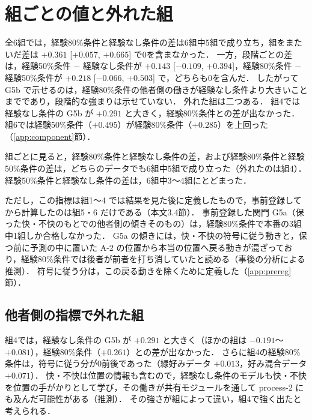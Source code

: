 \section{組ごとの値と外れた組}\label{sup:values}
\begin{table}[tbp]
  \centering
  \small
  \caption{組ごとの値と組をまたいだ差}
  \label{tab:group_values}
  
\end{table}

全6組では，経験80\%条件と経験なし条件の差は6組中5組で成り立ち，組をまたいだ差は $+0.361$ [$+0.057$, $+0.665$] で0を含まなかった．
一方，段階ごとの差は，経験50\%条件 $-$ 経験なし条件が $+0.143$ [$-0.109$, $+0.394$]，経験80\%条件 $-$ 経験50\%条件が $+0.218$ [$-0.066$, $+0.503$] で，どちらも0を含んだ．
したがって G5b で示せるのは，経験80\%条件の他者側の働きが経験なし条件より大きいことまでであり，段階的な強まりは示せていない．
外れた組は二つある．
組4では経験なし条件の G5b が $+0.291$ と大きく，経験80\%条件との差が出なかった．
組6では経験50\%条件（$+0.495$）が経験80\%条件（$+0.285$）を上回った（\ref{app:component}節）．

組ごとに見ると，経験80\%条件と経験なし条件の差，および経験80\%条件と経験50\%条件の差は，どちらのデータでも6組中5組で成り立った（外れたのは組4）．
経験50\%条件と経験なし条件の差は，6組中3〜4組にとどまった．

ただし，この指標は組1〜4 では結果を見た後に定義したもので，事前登録してから計算したのは組5・6 だけである（本文3.4節）．
事前登録した関門 G5a（保った快・不快のもとでの他者側の傾きそのもの）は，経験80\%条件で本番の3組中1組しか合格しなかった．
G5a の傾きには，快・不快の符号に従う動きと，保つ前に予測の中に置いた A-2 の位置から本当の位置へ戻る動きが混ざっており，経験80\%条件では後者が前者を打ち消していたと読める（事後の分析による推測）．
符号に従う分は，この戻る動きを除くために定義した（\ref{app:prereg}節）．

\subsection{他者側の指標で外れた組}
組4では，経験なし条件の G5b が $+0.291$ と大きく（ほかの組は $-0.191$〜$+0.081$），経験80\%条件（$+0.261$）との差が出なかった．
さらに組4の経験80\%条件は，符号に従う分が0前後であった（緑好みデータ $+0.013$，好み混合データ $+0.071$）．
快・不快は位置の情報も含むので，経験なし条件のモデルも快・不快を位置の手がかりとして学び，その働きが共有モジュールを通して process-2 にも及んだ可能性がある（推測）．
その強さが組によって違い，組4で強く出たと考えられる．

